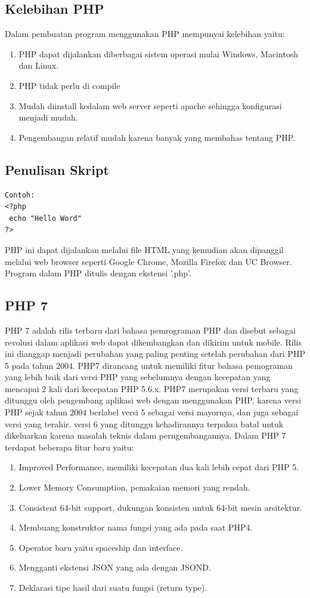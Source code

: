 \subsection{Kelebihan PHP}
Dalam pembuatan program menggunakan PHP mempunyai kelebihan yaitu:
\begin{enumerate}
\item PHP dapat dijalankan diberbagai sistem operasi mulai Windows, Macintosh dan Linux.
\item PHP tidak perlu di compile
\item Mudah diinstall kedalam web server seperti apache sehingga konfigurasi menjadi mudah.
\item Pengembangan relatif mudah karena banyak yang membahas tentang PHP.
\end{enumerate}

\subsection{Penulisan Skript}
\begin{lstlisting}
Contoh:
<?php
 echo "Hello Word"
?>
\end{lstlisting}
PHP ini dapat dijalankan melalui file HTML yang kemudian akan dipanggil melalui web browser seperti Google Chrome, Mozilla Firefox dan UC Browser.
Program dalam PHP ditulis dengan ekstensi '.php'.

\subsection{PHP 7}
PHP 7 adalah rilis terbaru dari bahasa pemrograman PHP dan disebut sebagai revolusi dalam aplikasi web dapat dikembangkan dan dikirim untuk mobile. Rilis ini dianggap menjadi perubahan yang paling penting setelah perubahan dari PHP 5 pada tahun 2004. PHP7 dirancang untuk memiliki fitur bahasa pemograman yang lebih baik dari versi PHP yang sebelumnya dengan kecepatan yang mencapai 2 kali dari kecepatan PHP 5.6.x. PHP7 merupakan versi terbaru yang ditunggu oleh pengembang aplikasi web dengan menggunakan PHP, karena versi PHP sejak tahun 2004 berlabel versi 5 sebagai versi mayornya, dan juga sebagai versi yang terahir. versi 6 yang ditunggu kehadirannya terpaksa batal untuk dikeluarkan karena masalah teknis dalam perngembangannya.
Dalam PHP 7 terdapat beberapa fitur baru yaitu:
\begin{enumerate}
\item Improved Performance, memiliki kecepatan dua kali lebih cepat dari PHP 5.
\item Lower Memory Consumption, pemakaian memori yang rendah.
\item Consistent 64-bit support, dukungan konsisten untuk 64-bit mesin arsitektur.
\item Membuang konstruktor nama fungsi yang ada pada saat PHP4.
\item Operator baru yaitu spaceship dan interface.
\item Mengganti ekstensi JSON yang ada dengan JSOND.
\item Deklarasi tipe hasil dari suatu fungsi (return type).
\end {enumerate}

